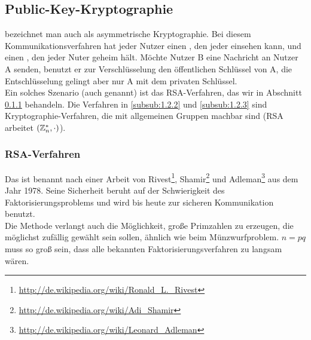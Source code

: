 \subsection{Public-Key-Kryptographie}
\label{sub:1.2}
	 bezeichnet man auch als asymmetrische Kryptographie.\marginnote{[5]} Bei diesem Kommunikationsverfahren hat jeder Nutzer einen , den jeder einsehen kann, und einen , den jeder Nuter geheim hält. Möchte Nutzer B eine Nachricht an Nutzer A senden, benutzt er zur Verschlüsselung den öffentlichen Schlüssel von A, die Entschlüsselung gelingt aber nur A mit dem privaten Schlüssel.   \\
	Ein solches Szenario (auch  genannt) ist das RSA-Verfahren, das wir in Abschnitt \ref{subsub:1.2.1} behandeln. Die Verfahren in \ref{subsub:1.2.2} und \ref{subsub:1.2.3} sind Kryptographie-Verfahren, die mit allgemeinen Gruppen machbar sind (RSA arbeitet $(\mathbb{Z}_n^*,\cdot)$).
	
\subsubsection{RSA-Verfahren}
\label{subsub:1.2.1}
	Das  ist benannt nach einer Arbeit von Rivest\footnote{\url{http://de.wikipedia.org/wiki/Ronald_L._Rivest}}, Shamir\footnote{\url{http://de.wikipedia.org/wiki/Adi_Shamir}} und Adleman\footnote{\url{http://de.wikipedia.org/wiki/Leonard_Adleman}} aus dem Jahr 1978. Seine Sicherheit beruht auf der Schwierigkeit des Faktorisierungsproblems und wird bis heute zur sicheren Kommunikation benutzt. \\
	Die Methode verlangt auch die Möglichkeit, große Primzahlen zu erzeugen, die möglichst zufällig gewählt sein sollen, ähnlich wie beim Münzwurfproblem. $n = pq$ muss so groß sein, dass alle bekannten Faktorisierungsverfahren zu langsam wären.
	
